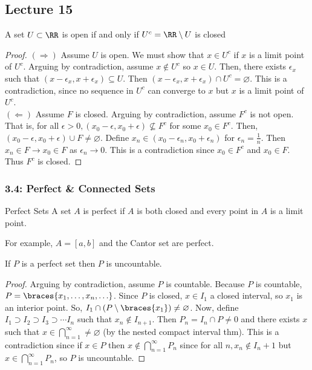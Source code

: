\subsection{Lecture 15}
\begin{thm}{}
    A set $U \subset \RR$ is open if and only if $U^{c} = \RR \setminus U$ is closed
    \begin{proof}
        $(\Rightarrow)$ Assume $U$ is open. We must show that $x \in U^c$ if $x$ is a limit point of $U^c$. Arguing by contradiction, assume $x \not\in U^c$ so $x \in U$. Then, there exists $\epsilon_x$ such that $(x - \epsilon_x, x + \epsilon_x) \subseteq U$. Then $(x - \epsilon_x, x + \epsilon_x) \cap U^c = \varnothing$. This is a contradiction, since no sequence in $U^c$ can converge to $x$ but $x$ is a limit point of $U^c$. \\
        $(\Leftarrow)$ Assume $F$ is closed. Arguing by contradiction, assume $F^c$ is not open. That is, for all $\epsilon > 0, (x_0 - \epsilon, x_0 + \epsilon) \not\subseteq F^c$ for some $x_0 \in F^c$. Then, $(x_0 - \epsilon, x_0 + \epsilon) \cup F \neq \varnothing$. Define $x_n \in (x_0 - \epsilon_n, x_0 + \epsilon_n)$ for $\epsilon_n = \frac{1}{n}$. Then $x_n \in F \to x_0 \in F$ as $\epsilon_n \to 0$. This is a contradiction since $x_0 \in F^c$ and $x_0 \in F$. Thus $F^c$ is closed.
    \end{proof}
\end{thm}

\subsubsection{3.4: Perfect \& Connected Sets}
\begin{defbox}{Perfect Sets}
    A set $A$ is perfect if $A$ is both closed and every point in $A$ is a limit point.
\end{defbox}

For example, $A = [a, b]$ and the Cantor set are perfect.

\begin{thm}{}
    If $P$ is a perfect set then $P$ is uncountable.

    \begin{proof}
        Arguing by contradiction, assume $P$ is countable. Because $P$ is countable, $P = \braces{x_1, \ldots, x_n, \ldots}$. Since $P$ is closed, $x \in I_1$ a closed interval, so $x_1$ is an interior point. So, $I_1 \cap (P \setminus \braces{x_1}) \neq \varnothing$. Now, define $I_1 \supset I_2 \supset I_3 \supset \cdots I_n$ such that $x_n \not\in I_{n+1}$. Then $P_n = I_n \cap P \neq 0$ and there exists $x$ such that $x \in \bigcap_{n=1}^{\infty} \neq \varnothing$ (by the nested compact interval thm). This is a contradiction since if $x \in P$ then $x \not\in \bigcap_{n=1}^\infty P_n$ since for all $n, x_n \not\in I_n+1$ but $x \in \bigcap_{n=1}^\infty P_n$, so $P$ is uncountable.
    \end{proof}
\end{thm}